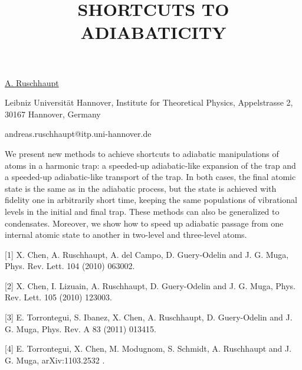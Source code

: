 \title{SHORTCUTS TO ADIABATICITY}

\underline{A. Ruschhaupt} 

{\normalsize{\vspace{-4mm}
Leibniz Universit\"{a}t Hannover, Institute for Theoretical Physics,
Appelstrasse 2, 30167 Hannover, Germany

\email andreas.ruschhaupt@itp.uni-hannover.de}}

We present new methods to achieve shortcuts to adiabatic manipulations of atoms in a harmonic trap: a speeded-up adiabatic-like expansion of the trap and a speeded-up adiabatic-like transport of the trap. In both cases, the final atomic state is the same as in the adiabatic process, but the state is achieved with fidelity one in arbitrarily short time, keeping the same populations of vibrational levels in the initial and final trap. These methods can also be generalized to condensates. Moreover, we show how to speed up adiabatic passage from one internal atomic state to another in two-level and three-level atoms.

{\normalsize
[1] X. Chen, A. Ruschhaupt, A. del Campo, D. Guery-Odelin and J. G. Muga, Phys. Rev. Lett. 104 (2010) 063002.
\vsp

[2] X. Chen, I. Lizuain, A. Ruschhaupt, D. Guery-Odelin and J. G. Muga, Phys. Rev. Lett. 105 (2010) 123003.
\vsp

[3] E. Torrontegui, S. Ibanez, X. Chen, A. Ruschhaupt, D. Guery-Odelin and J. G. Muga, Phys. Rev. A 83 (2011) 013415.
\vsp

[4] E. Torrontegui, X. Chen, M. Modugnom, S. Schmidt, A. Ruschhaupt and J. G. Muga, arXiv:1103.2532 .
}

\vspace{\baselineskip} 